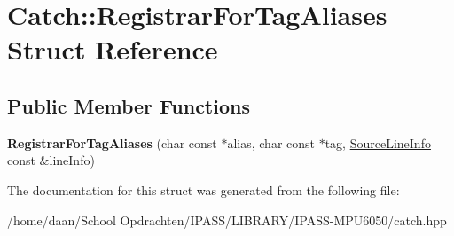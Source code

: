 \hypertarget{structCatch_1_1RegistrarForTagAliases}{}\section{Catch\+:\+:Registrar\+For\+Tag\+Aliases Struct Reference}
\label{structCatch_1_1RegistrarForTagAliases}
\subsection*{Public Member Functions}
\begin{DoxyCompactItemize}
\item 
\mbox{\label{structCatch_1_1RegistrarForTagAliases_ae4e45830e4763bcd65d55d8db9167b69}} 
{\bfseries Registrar\+For\+Tag\+Aliases} (char const $\ast$alias, char const $\ast$tag, \hyperlink{structCatch_1_1SourceLineInfo}{Source\+Line\+Info} const \&line\+Info)
\end{DoxyCompactItemize}


The documentation for this struct was generated from the following file\+:\begin{DoxyCompactItemize}
\item 
/home/daan/\+School Opdrachten/\+I\+P\+A\+S\+S/\+L\+I\+B\+R\+A\+R\+Y/\+I\+P\+A\+S\+S-\/\+M\+P\+U6050/catch.\+hpp\end{DoxyCompactItemize}

